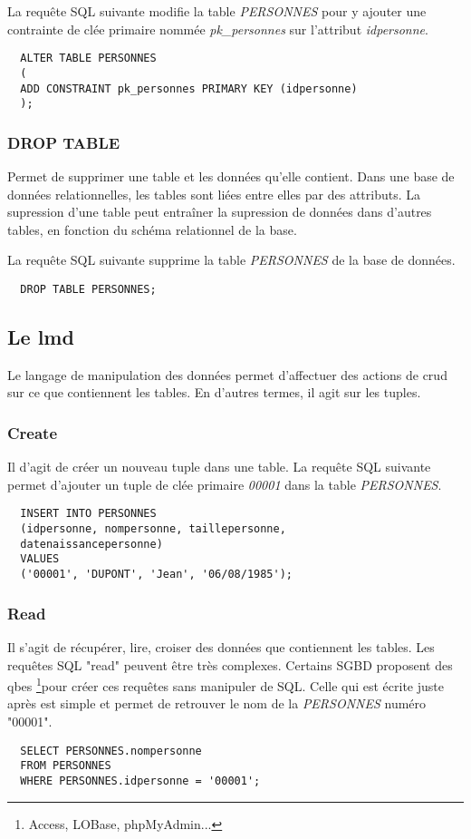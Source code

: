 La requête SQL suivante modifie la table \textit{PERSONNES} pour y ajouter une contrainte de clée primaire nommée \textit{pk\_personnes} sur l'attribut \textit{idpersonne}.

\begin{lstlisting}
  ALTER TABLE PERSONNES
  (
  ADD CONSTRAINT pk_personnes PRIMARY KEY (idpersonne)
  );
\end{lstlisting}

\subsubsection{DROP TABLE}
Permet de supprimer une table et les données qu'elle contient.
Dans une base de données relationnelles, les tables sont liées entre elles par des attributs.
La supression d'une table peut entraîner la supression de données dans d'autres tables, en fonction du schéma relationnel de la base.

La requête SQL suivante supprime la table \textit{PERSONNES} de la base de données.
\begin{lstlisting}
  DROP TABLE PERSONNES;
\end{lstlisting}

\subsection{Le \gls{lmd}}
Le langage de manipulation des données permet d'affectuer des actions de \gls{crud} sur ce que contiennent les tables.
En d'autres termes, il agit sur les tuples.

\subsubsection{Create}
Il d'agit de créer un nouveau tuple dans une table.
La requête SQL suivante permet d'ajouter un tuple de clée primaire \textit{00001} dans la table \textit{PERSONNES}.
\begin{lstlisting}
  INSERT INTO PERSONNES
  (idpersonne, nompersonne, taillepersonne,
  datenaissancepersonne)
  VALUES
  ('00001', 'DUPONT', 'Jean', '06/08/1985');
\end{lstlisting}

\subsubsection{Read}
Il s'agit de récupérer, lire, croiser des données que contiennent les tables.
Les requêtes SQL  "read" peuvent être très complexes.
Certains SGBD proposent des \glspl{qbe}
\footnote{Access, LOBase, phpMyAdmin...}pour créer ces requêtes sans manipuler de SQL.
Celle qui est écrite juste après est simple et permet de retrouver le nom de la \textit{PERSONNES} numéro "00001".
\begin{lstlisting}
  SELECT PERSONNES.nompersonne
  FROM PERSONNES
  WHERE PERSONNES.idpersonne = '00001';
\end{lstlisting}

